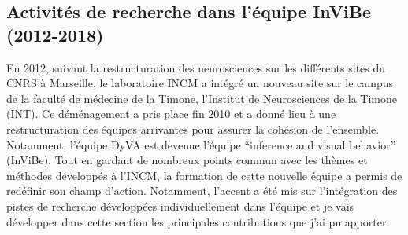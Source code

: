 \subsection{Activités de recherche dans l'équipe InViBe (2012-2018)}
\label{sec:invibe}%



En 2012, suivant la restructuration des neurosciences sur les différents sites du CNRS à Marseille, le laboratoire INCM a intégré un nouveau site sur le campus de la faculté de médecine de la Timone, l'Institut de Neurosciences de la Timone (INT). Ce déménagement a pris place fin 2010 et a donné lieu à une restructuration des équipes arrivantes pour assurer la cohésion de l'ensemble. Notamment, l'équipe DyVA est devenue l'équipe ``inference and visual behavior'' ({\sc InViBe}). Tout en gardant de nombreux points commun avec les thèmes et méthodes développés à l'INCM, la formation de cette nouvelle équipe a permis de redéfinir son champ d'action. Notamment, l'accent a été mis sur l'intégration des pistes de recherche développées individuellement dans l'équipe et je vais développer dans cette section les principales contributions que j'ai pu apporter. %

